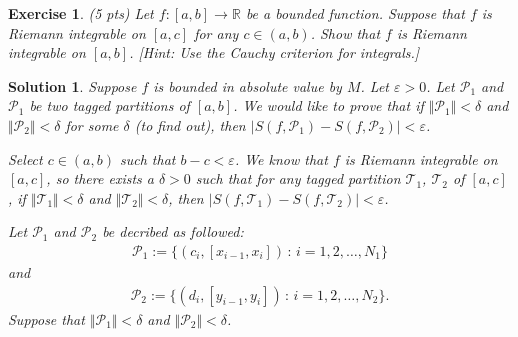 \documentclass[12pt]{article}
\newcommand{\bR}{\mathbb{R}}
\newcommand{\cP}{\mathcal{P}}
\newcommand{\cT}{\mathcal{T}}
\newcommand{\ra}{\rightarrow}
\theoremstyle{plain}
\newtheorem{exer}{\textbf{Exercise}}}
\theoremstyle{plain}
\newtheorem*{sol}{\textbf{Solution}}}
\theoremstyle{plain}
\theoremstyle{plain}
\begin{document}
\begin{exer}
(5 pts)
Let $f : [a, b] \ra \bR$ be a bounded function. Suppose that $f$ is Riemann integrable on $[a, c]$ for any $c \in (a, b)$. Show that $f$ is Riemann integrable on $[a, b]$. [Hint: Use the Cauchy criterion for integrals.]
\end{exer}
\begin{sol}
Suppose $f$ is bounded in absolute value by $M$. Let $\varepsilon > 0$. Let $\cP_1$ and $\cP_1$ be two tagged partitions of $[a, b]$. We would like to prove that if $\Vert \cP_1 \Vert < \delta $ and $\Vert \cP_2 \Vert < \delta$ for some $\delta$ (to find out), then $|S (f , \cP_1 ) - S (f , \cP_2 ) | < \varepsilon$. 

Select $c \in (a, b)$ such that $b - c < \varepsilon$. We know that $f$ is Riemann integrable on $[a, c]$, so there exists a $\delta > 0$ such that for any tagged partition $\cT_1$, $\cT_2$ of $[a, c]$, if $\Vert \cT_1 \Vert < \delta$ and $\Vert \cT_2 \Vert < \delta$, then $|S (f, \cT_1 ) - S (f , \cT_2 )| < \varepsilon$. 

Let $\cP_1$ and $\cP_2$ be decribed as followed:
	\begin{align*}
	\cP_1 := \{ (c_i , [x_{i - 1} , x_i] ) \, : \, i = 1, 2, \ldots  , N_1 \}
	\end{align*}
and
	\begin{align*}
	\cP_2 := \{ (d_i , [y_{i - 1} , y_i ]) \, : \, i = 1 , 2, \ldots , N_2 \} .
	\end{align*}
Suppose that $\Vert \cP_1 \Vert < \delta$ and $\Vert \cP_2 \Vert < \delta$.
	

\end{sol}
\end{document}
